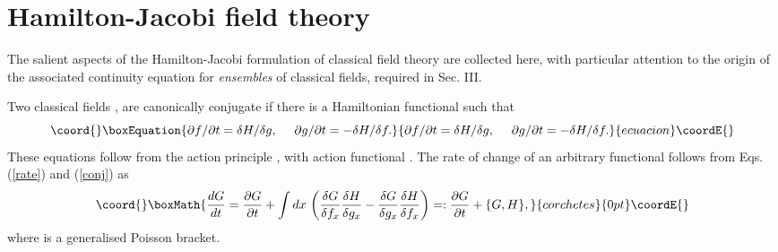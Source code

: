 \documentclass[a4paper,preprint, showpacs, aps, draft]{revtex4}
\begin{document}
{{\section{ Hamilton-Jacobi field theory}
The salient aspects of the Hamilton-Jacobi formulation of classical
field theory \cite{goldstein}
are collected here, with particular attention to the origin
of the associated continuity equation for {\it ensembles} of classical
fields, required in Sec. III.

Two classical fields \coordHE{}, \coordHE{} are canonically conjugate if there is a
Hamiltonian functional \coordHE{} such that 
\begin{equation}\coord{}\boxEquation{ \label{conj}
\partial f/\partial t = \delta H/\delta g, ~~~~\partial g/\partial t =
-\delta H/\delta f .
}{ \partial f/\partial t = \delta H/\delta g, ~~~~\partial g/\partial t =
-\delta H/\delta f .
}{ecuacion}\coordE{}\end{equation}
These equations follow from the action principle \coordHE{}, with
action functional \coordHE{}.  The rate of change of an arbitrary functional
\coordHE{} follows from Eqs. (\ref{rate}) and (\ref{conj}) as
\[\coord{}\boxMath{
\frac{dG}{dt} = \frac{\partial G}{\partial t} + \int dx\,\left(
\frac{\delta G}{\delta f_x} \frac{\delta H}{\delta g_x} - \frac{\delta
G}{\delta g_x}\frac{\delta H}{\delta f_x} \right)
=: \frac{\partial G}{\partial
t} + \{ G,H\} , 
}{corchetes}{0pt}\coordE{}\]
where \myHighlight{$\{~,~\}$}\coordHE{} is a generalised Poisson bracket.

}}
\end{document}
